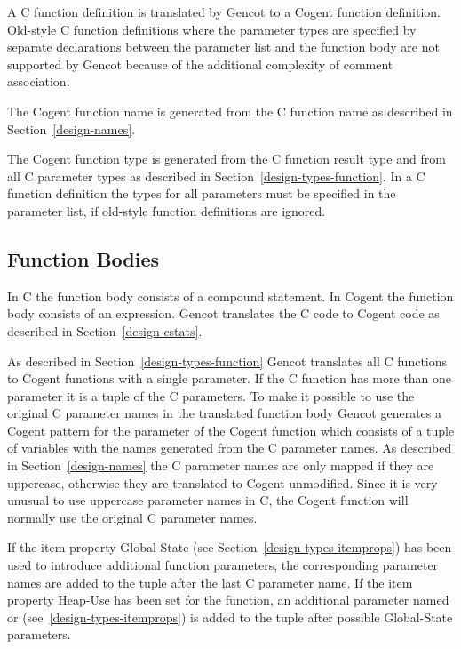
A C function definition is translated by Gencot to a Cogent function definition. Old-style C function definitions
where the parameter types are specified by separate declarations between the parameter list and the function body
are not supported by Gencot because of the additional complexity of comment association.

The Cogent function name is generated from the C function name as described in Section~\ref{design-names}.

The Cogent function type is generated from the C function result type and from all C parameter types as described
in Section~\ref{design-types-function}. In a C
function definition the types for all parameters must be specified in the parameter list, if old-style function
definitions are ignored.

\subsection{Function Bodies}
\label{design-fundefs-body}

In C the function body consists of a compound statement. In Cogent
the function body consists of an expression. Gencot translates the C code to Cogent code as described
in Section~\ref{design-cstats}.

As described in Section~\ref{design-types-function} Gencot translates all C functions to Cogent functions with
a single parameter. If the C function has more than one parameter it is a tuple of the C parameters. To make it
possible to use the original C parameter names in the translated function body
Gencot generates a Cogent pattern for the parameter of the Cogent function which 
consists of a tuple of variables with the names generated from the C parameter names. As described in 
Section~\ref{design-names} the C parameter names are only mapped if they are uppercase, otherwise they are
translated to Cogent unmodified. Since it is very unusual
to use uppercase parameter names in C, the Cogent function will normally use the original C parameter names.

If the item property Global-State (see Section~\ref{design-types-itemprops}) has been used to introduce additional 
function parameters, the corresponding parameter names are added to the tuple after the last C parameter name.
If the item property Heap-Use has been set for the function, an additional parameter named  or 
 (see~\ref{design-types-itemprops}) is added to the tuple after possible Global-State parameters.

